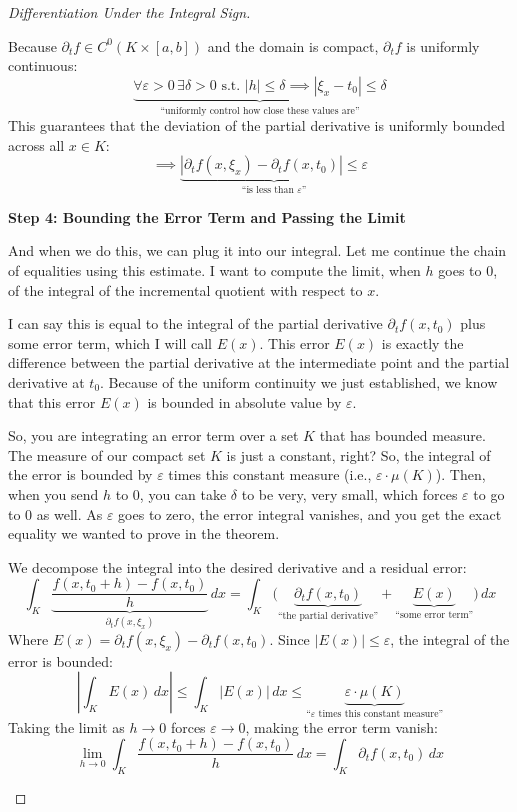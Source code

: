 \begin{proof}[Differentiation Under the Integral Sign]
\begin{math-stroke}
Because $\partial_t f \in C^0(K \times [a,b])$ and the domain is compact, $\partial_t f$ is uniformly continuous:
\[
\underbrace{\forall \varepsilon > 0 \, \exists \delta > 0 \text{ s.t. } |h| \le \delta \implies |\xi_x - t_0| \le \delta}_{\text{``uniformly control how close these values are''}}
\]
This guarantees that the deviation of the partial derivative is uniformly bounded across all $x \in K$:
\[
\implies \underbrace{| \partial_t f(x, \xi_x) - \partial_t f(x, t_0) | \le \varepsilon}_{\text{``is less than } \varepsilon \text{''}}
\]
\end{math-stroke}

\textbf{Step 4: Bounding the Error Term and Passing the Limit}
\begin{spoken-clean}[00:03:00 - 00:06:18]
And when we do this, we can plug it into our integral. Let me continue the chain of equalities using this estimate. I want to compute the limit, when $h$ goes to $0$, of the integral of the incremental quotient with respect to $x$. 

I can say this is equal to the integral of the partial derivative $\partial_t f(x, t_0)$ plus some error term, which I will call $E(x)$. This error $E(x)$ is exactly the difference between the partial derivative at the intermediate point and the partial derivative at $t_0$. Because of the uniform continuity we just established, we know that this error $E(x)$ is bounded in absolute value by $\varepsilon$. 

So, you are integrating an error term over a set $K$ that has bounded measure. The measure of our compact set $K$ is just a constant, right? So, the integral of the error is bounded by $\varepsilon$ times this constant measure (i.e., $\varepsilon \cdot \mu(K)$). Then, when you send $h$ to $0$, you can take $\delta$ to be very, very small, which forces $\varepsilon$ to go to $0$ as well. As $\varepsilon$ goes to zero, the error integral vanishes, and you get the exact equality we wanted to prove in the theorem.
\end{spoken-clean}

\begin{math-stroke}
We decompose the integral into the desired derivative and a residual error:
\[
\int_K \underbrace{\frac{f(x, t_0+h) - f(x, t_0)}{h}}_{\partial_t f(x, \xi_x)} \, dx = \int_K \big( \underbrace{\partial_t f(x, t_0)}_{\text{``the partial derivative''}} + \underbrace{E(x)}_{\text{``some error term''}} \big) \, dx
\]
Where $E(x) = \partial_t f(x, \xi_x) - \partial_t f(x, t_0)$. Since $|E(x)| \le \varepsilon$, the integral of the error is bounded:
\[
\left| \int_K E(x) \, dx \right| \le \int_K |E(x)| \, dx \le \underbrace{\varepsilon \cdot \mu(K)}_{\text{``} \varepsilon \text{ times this constant measure''}}
\]
Taking the limit as $h \to 0$ forces $\varepsilon \to 0$, making the error term vanish:
\[
\lim_{h \to 0} \int_K \frac{f(x, t_0+h) - f(x, t_0)}{h} \, dx = \int_K \partial_t f(x, t_0) \, dx
\]
\end{math-stroke}
\end{proof}

